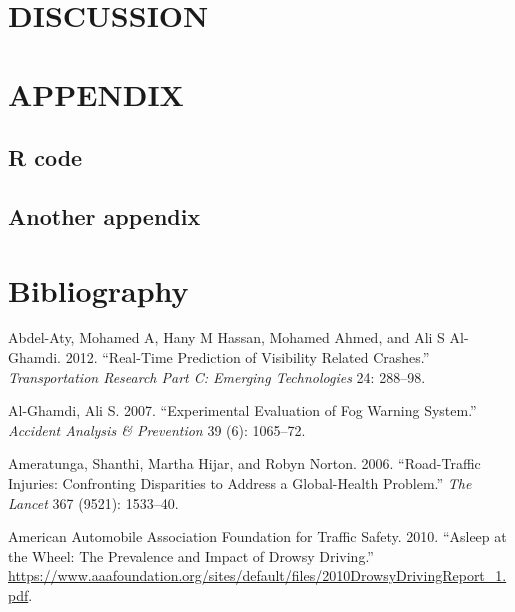\documentclass[12pt]{book}
\numberwithin{equation}{chapter}
\begin{document}
\hypertarget{discussion}{%
\chapter{DISCUSSION}\label{discussion}}

\cleardoublepage

\hypertarget{appendix}{%
\chapter*{APPENDIX}\label{appendix}}

\hypertarget{r-code}{%
\section*{R code}\label{r-code}}

\hypertarget{another-appendix}{%
\section*{Another appendix}\label{another-appendix}}

\cleardoublepage

\hypertarget{bibliography}{%
\chapter*{Bibliography}\label{bibliography}}

\hypertarget{refs}{}
\leavevmode\hypertarget{ref-abdel2012real}{}%
Abdel-Aty, Mohamed A, Hany M Hassan, Mohamed Ahmed, and Ali S Al-Ghamdi. 2012. ``Real-Time Prediction of Visibility Related Crashes.'' \emph{Transportation Research Part C: Emerging Technologies} 24: 288--98.

\leavevmode\hypertarget{ref-al2007experimental}{}%
Al-Ghamdi, Ali S. 2007. ``Experimental Evaluation of Fog Warning System.'' \emph{Accident Analysis \& Prevention} 39 (6): 1065--72.

\leavevmode\hypertarget{ref-ameratunga2006road}{}%
Ameratunga, Shanthi, Martha Hijar, and Robyn Norton. 2006. ``Road-Traffic Injuries: Confronting Disparities to Address a Global-Health Problem.'' \emph{The Lancet} 367 (9521): 1533--40.

\leavevmode\hypertarget{ref-aaafoundation}{}%
American Automobile Association Foundation for Traffic Safety. 2010. ``Asleep at the Wheel: The Prevalence and Impact of Drowsy Driving.'' \url{https://www.aaafoundation.org/sites/default/files/2010DrowsyDrivingReport_1.pdf}.
\end{document}

